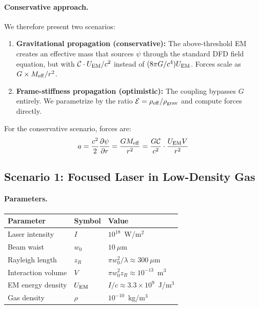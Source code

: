 \documentclass[12pt,a4paper]{article}
\begin{document}
\paragraph{Conservative approach.}
We therefore present two scenarios:
\begin{enumerate}
\item \textbf{Gravitational propagation (conservative):} The above-threshold
EM creates an effective mass that sources $\psi$ through the standard
DFD field equation, but with $\mathcal{C} \cdot U_{\rm EM}/c^2$ instead of
$(8\pi G/c^4) U_{\rm EM}$.  Forces scale as $G \times M_{\rm eff}/r^2$.

\item \textbf{Frame-stiffness propagation (optimistic):} The coupling
bypasses $G$ entirely.  We parametrize by the ratio
$\mathcal{E} = \rho_{\rm eff}/\rho_{\rm grav}$ and compute forces directly.
\end{enumerate}

For the conservative scenario, forces are:
\begin{equation}
a = \frac{c^2}{2}\frac{\partial \psi}{\partial r}
= \frac{G M_{\rm eff}}{r^2}
= \frac{G \mathcal{C}}{c^2} \cdot \frac{U_{\rm EM} V}{r^2}
\end{equation}

\subsection{Scenario 1: Focused Laser in Low-Density Gas}

\paragraph{Parameters.}
\begin{center}
\begin{tabular}{lll}
\toprule
Parameter & Symbol & Value \\
\midrule
Laser intensity & $I$ & $10^{18}$~W/m$^2$ \\
Beam waist & $w_0$ & $10~\mu$m \\
Rayleigh length & $z_R$ & $\pi w_0^2/\lambda \approx 300~\mu$m \\
Interaction volume & $V$ & $\pi w_0^2 z_R \approx 10^{-13}$~m$^3$ \\
EM energy density & $U_{\rm EM}$ & $I/c \approx 3.3 \times 10^9$~J/m$^3$ \\
Gas density & $\rho$ & $10^{-10}$~kg/m$^3$ \\
\bottomrule
\end{tabular}
\end{center}
\end{document}
